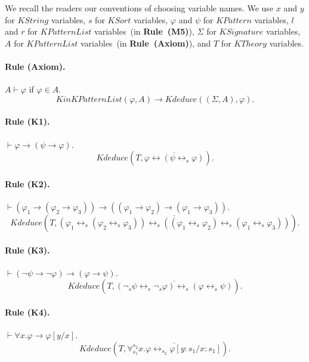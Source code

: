 \documentclass[UTF8,11pt]{article}
\theoremstyle{plain}
\theoremstyle{definition}
\theoremstyle{remark}
\newcommand{\cln}{{:}}
\newcommand{\KString}{\mathit{KString}}
\newcommand{\KSort}{\mathit{KSort}}
\newcommand{\KPatternList}{\mathit{KPatternList}}
\newcommand{\KinKPatternList}{\mathit{KinKPatternList}}
\newcommand{\KPattern}{\mathit{KPattern}}
\newcommand{\KSignature}{\mathit{KSignature}}
\newcommand{\KTheory}{\mathit{KTheory}}
\newcommand{\Kdeduce}{\mathit{Kdeduce}}
\begin{document}
We recall the readers our conventions of choosing variable names. 
We use 
$x$ and $y$ for $\KString$ variables,
$s$ for $\KSort$ variables,
$\varphi$ and $\psi$ for $\KPattern$ variables,
$l$ and $r$ for $\KPatternList$ variables~(in \textbf{Rule~(M5)}),
$\Sigma$ for $\KSignature$ variables, 
$A$ for $\KPatternList$ variables~(in \textbf{Rule~(Axiom)}),
and $T$ for $\KTheory$ variables.

\paragraph{Rule (Axiom).}
$A \vdash \varphi$ if $\varphi \in A$.
\begin{equation*}
\KinKPatternList(\varphi, A) \to \Kdeduce(( \Sigma, A ), \varphi).
\end{equation*}

\paragraph{Rule (K1).}
$\vdash \varphi \to (\psi \to \varphi)$.
\begin{equation*}
\Kdeduce(T, \overline{\varphi \leftrightarrow (\psi \leftrightarrow_s  \varphi)}).
\end{equation*}

\paragraph{Rule (K2).}
$\vdash (\varphi_1 \to (\varphi_2 \to \varphi_3)) \to ((\varphi_1 \to \varphi_2) \to (\varphi_1 \to \varphi_3))$.
\begin{equation*}
\Kdeduce(T, 
\overline{(\varphi_1 \leftrightarrow_s (\varphi_2 \leftrightarrow_s \varphi_3)) \leftrightarrow_s ((\varphi_1 \leftrightarrow_s \varphi_2) \leftrightarrow_s (\varphi_1 \leftrightarrow_s \varphi_3))}).
\end{equation*}

\paragraph{Rule (K3).}
$\vdash (\neg \psi \to \neg \varphi) \to (\varphi \to \psi)$.
\begin{equation*}
\Kdeduce(T, \overline{(\neg_s \psi \leftrightarrow_s \neg_s \varphi) \leftrightarrow_s (\varphi 
\leftrightarrow_s \psi)}).
\end{equation*}

\paragraph{Rule (K4).}
$\vdash \forall x . \varphi \to \varphi[y/x]$.
\begin{equation*}
\Kdeduce(T, \overline{\forall_{s_1}^{s_2}  x . \varphi \leftrightarrow_{s_2} \varphi[y \cln s_1 / x \cln s_1]}).
\end{equation*}
\end{document}
